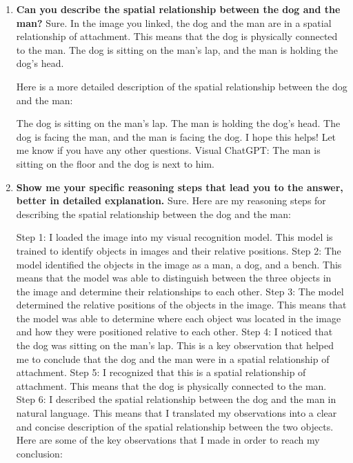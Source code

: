     \begin{enumerate}
        \item \textbf{Can you describe the spatial relationship between the dog and the man?}
        \subitem Sure. In the image you linked, the dog and the man are in a spatial relationship of attachment. This means that the dog is physically connected to the man. The dog is sitting on the man's lap, and the man is holding the dog's head.

        Here is a more detailed description of the spatial relationship between the dog and the man:
        
        The dog is sitting on the man's lap.
        The man is holding the dog's head.
        The dog is facing the man, and the man is facing the dog.
        I hope this helps! Let me know if you have any other questions.
        \subitem Visual ChatGPT: The man is sitting on the floor and the dog is next to him.
        \item \textbf{Show me your specific reasoning steps that lead you to the answer, better in detailed explanation.}
        \subitem Sure. Here are my reasoning steps for describing the spatial relationship between the dog and the man:

        Step 1: I loaded the image into my visual recognition model. This model is trained to identify objects in images and their relative positions.
        Step 2: The model identified the objects in the image as a man, a dog, and a bench. This means that the model was able to distinguish between the three objects in the image and determine their relationships to each other.
        Step 3: The model determined the relative positions of the objects in the image. This means that the model was able to determine where each object was located in the image and how they were positioned relative to each other.
        Step 4: I noticed that the dog was sitting on the man's lap. This is a key observation that helped me to conclude that the dog and the man were in a spatial relationship of attachment.
        Step 5: I recognized that this is a spatial relationship of attachment. This means that the dog is physically connected to the man.
        Step 6: I described the spatial relationship between the dog and the man in natural language. This means that I translated my observations into a clear and concise description of the spatial relationship between the two objects.
        Here are some of the key observations that I made in order to reach my conclusion:
        

\end{enumerate}

